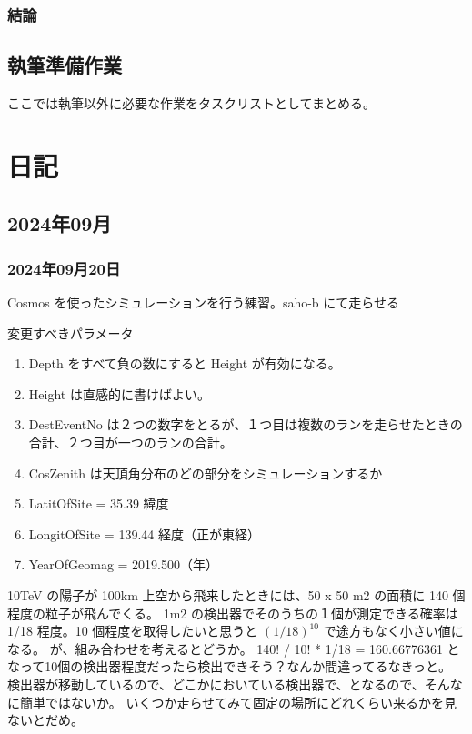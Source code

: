 \documentclass[uplatex]{jreport}
\begin{document}
\subsection*{結論}

\section{執筆準備作業}

ここでは執筆以外に必要な作業をタスクリストとしてまとめる。





\chapter{日記}

\section*{2024年09月}
\subsection*{2024年09月20日}

Cosmos を使ったシミュレーションを行う練習。saho-b にて走らせる

\begin{qbox}{変更すべきパラメータ}
\begin{enumerate}
   \item Depth をすべて負の数にすると Height が有効になる。
   \item Height は直感的に書けばよい。
   \item DestEventNo は２つの数字をとるが、１つ目は複数のランを走らせたときの合計、２つ目が一つのランの合計。
   \item CosZenith は天頂角分布のどの部分をシミュレーションするか
   \item LatitOfSite = 35.39 緯度
   \item LongitOfSite = 139.44 経度（正が東経）
   \item YearOfGeomag = 2019.500（年）
\end{enumerate}
\end{qbox}

10TeV の陽子が 100km 上空から飛来したときには、50 x 50 m2 の面積に 140 個程度の粒子が飛んでくる。
1m2 の検出器でそのうちの１個が測定できる確率は 1/18 程度。10 個程度を取得したいと思うと $(1/18)^10$ で途方もなく小さい値になる。
が、組み合わせを考えるとどうか。 140! / 10! * 1/18 = 160.66776361 となって10個の検出器程度だったら検出できそう？なんか間違ってるなきっと。
検出器が移動しているので、どこかにおいている検出器で、となるので、そんなに簡単ではないか。
いくつか走らせてみて固定の場所にどれくらい来るかを見ないとだめ。
\end{document}

